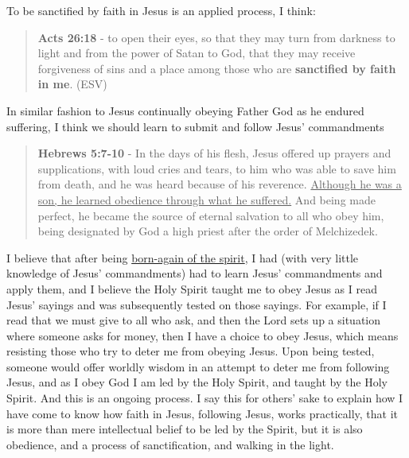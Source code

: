 \documentclass[11pt]{article}
\begin{document}
To be sanctified by faith in Jesus is an applied process, I think:

\begin{quote}
\textbf{Acts 26:18} - to open their eyes, so that they may turn from darkness to light and from the power of Satan to God, that they may receive forgiveness of sins and a place among those who are \textbf{sanctified by faith in me}. (ESV)
\end{quote}

In similar fashion to Jesus continually obeying Father God as he endured suffering, I think we should learn to submit and follow Jesus' commandments

\begin{quote}
\textbf{Hebrews 5:7-10} - In the days of his flesh, Jesus offered up prayers and supplications, with loud cries and tears, to him who was able to save him from death, and he was heard because of his reverence. \uline{Although he was a son, he learned obedience through what he suffered.} And being made perfect, he became the source of eternal salvation to all who obey him, being designated by God a high priest after the order of Melchizedek.
\end{quote}

I believe that after being \href{https://web.archive.org/web/20220402091720/https://mullikine.github.io/posts/astral-projection/}{born-again of the spirit}, I had (with very little knowledge of Jesus' commandments) had to learn Jesus' commandments and apply them, and I believe the Holy Spirit taught me to obey Jesus as I read Jesus' sayings and was subsequently tested on those sayings. For example, if I read that we must give to all who ask, and then the Lord sets up a situation where someone asks for money, then I have a choice to obey Jesus, which means resisting those who try to deter me from obeying Jesus. Upon being tested, someone would offer worldly wisdom in an attempt to deter me from following Jesus, and as I obey God I am led by the Holy Spirit, and taught by the Holy Spirit. And this is an ongoing process. I say this for others' sake to explain how I have come to know how faith in Jesus, following Jesus, works practically, that it is more than mere intellectual belief to be led by the Spirit, but it is also obedience, and a process of sanctification, and walking in the light.
\end{document}
